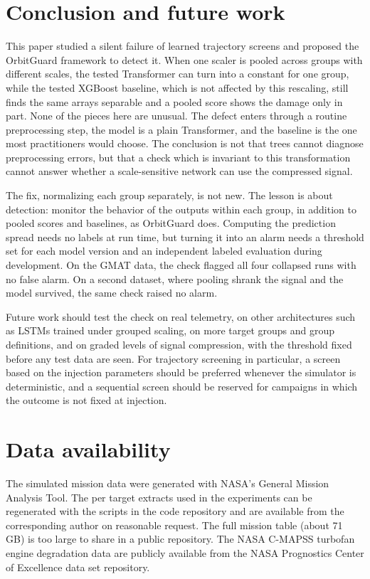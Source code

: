 \section{Conclusion and future work}
\label{sec:conclusion}

This paper studied a silent failure of learned trajectory screens and proposed the OrbitGuard framework to detect it. When one scaler is pooled across groups with different scales, the tested Transformer can turn into a constant for one group, while the tested XGBoost baseline, which is not affected by this rescaling, still finds the same arrays separable and a pooled score shows the damage only in part. None of the pieces here are unusual. The defect enters through a routine preprocessing step, the model is a plain Transformer, and the baseline is the one most practitioners would choose. The conclusion is not that trees cannot diagnose preprocessing errors, but that a check which is invariant to this transformation cannot answer whether a scale-sensitive network can use the compressed signal.

The fix, normalizing each group separately, is not new. The lesson is about detection: monitor the behavior of the outputs within each group, in addition to pooled scores and baselines, as OrbitGuard does. Computing the prediction spread needs no labels at run time, but turning it into an alarm needs a threshold set for each model version and an independent labeled evaluation during development. On the GMAT data, the check flagged all four collapsed runs with no false alarm. On a second dataset, where pooling shrank the signal and the model survived, the same check raised no alarm.

Future work should test the check on real telemetry, on other architectures such as LSTMs trained under grouped scaling, on more target groups and group definitions, and on graded levels of signal compression, with the threshold fixed before any test data are seen. For trajectory screening in particular, a screen based on the injection parameters should be preferred whenever the simulator is deterministic, and a sequential screen should be reserved for campaigns in which the outcome is not fixed at injection.

\section*{Data availability}

The simulated mission data were generated with NASA's General Mission Analysis Tool. The per target extracts used in the experiments can be regenerated with the scripts in the code repository and are available from the corresponding author on reasonable request. The full mission table (about 71 GB) is too large to share in a public repository. The NASA C-MAPSS turbofan engine degradation data are publicly available from the NASA Prognostics Center of Excellence data set repository.


